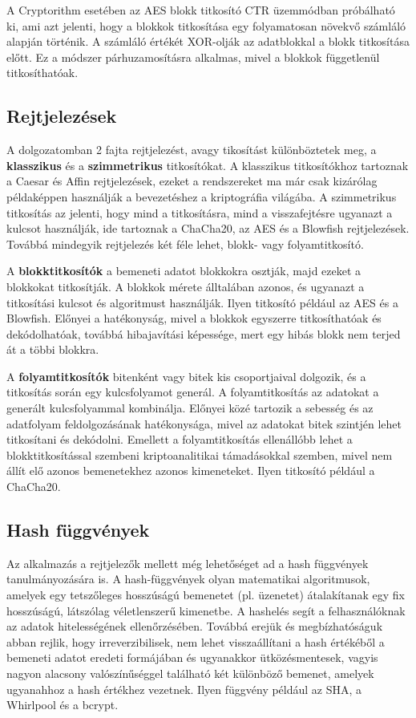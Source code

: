 A Cryptorithm esetében az AES blokk titkosító CTR üzemmódban próbálható ki, ami azt jelenti, hogy a blokkok titkosítása egy folyamatosan növekvő számláló alapján történik. A számláló értékét XOR-olják az adatblokkal a blokk titkosítása előtt. Ez a módszer párhuzamosításra alkalmas, mivel a blokkok függetlenül titkosíthatóak.

\subsection{Rejtjelezések}
A dolgozatomban 2 fajta rejtjelezést, avagy tikosítást különböztetek meg, a \textbf{klasszikus} és a \textbf{szimmetrikus} titkosítókat. A klasszikus titkosítókhoz tartoznak a Caesar és Affin rejtjelezések, ezeket a rendszereket ma már csak kizárólag példaképpen használják a bevezetéshez a kriptográfia világába. A szimmetrikus titkosítás az jelenti, hogy mind a titkosításra, mind a visszafejtésre ugyanazt a kulcsot használják, ide tartoznak a ChaCha20, az AES és a Blowfish rejtjelezések. Továbbá mindegyik rejtjelezés két féle lehet, blokk- vagy folyamtitkosító.

A \textbf{blokktitkosítók} a bemeneti adatot blokkokra osztják, majd ezeket a blokkokat titkosítják. A blokkok mérete álltalában azonos, és ugyanazt a titkosítási kulcsot és algoritmust használják. Ilyen titkosító például az AES és a Blowfish. Előnyei a hatékonyság, mivel a blokkok egyszerre titkosíthatóak és dekódolhatóak, továbbá hibajavítási képessége, mert egy hibás blokk nem terjed át a többi blokkra.

A \textbf{folyamtitkosítók} bitenként vagy bitek kis csoportjaival dolgozik, és a titkosítás során egy kulcsfolyamot generál. A folyamtitkosítás az adatokat a generált kulcsfolyammal kombinálja. Előnyei közé tartozik a sebesség és az adatfolyam feldolgozásának hatékonysága, mivel az adatokat bitek szintjén lehet titkosítani és dekódolni. Emellett a folyamtitkosítás ellenállóbb lehet a blokktitkosítással szembeni kriptoanalitikai támadásokkal szemben, mivel nem állít elő azonos bemenetekhez azonos kimeneteket. Ilyen titkosító például a ChaCha20.

\pagebreak
\subsection{Hash függvények}
Az alkalmazás a rejtjelezők mellett még lehetőséget ad a hash függvények tanulmányozására is. A hash-függvények olyan matematikai algoritmusok, amelyek egy tetszőleges hosszúságú bemenetet (pl. üzenetet) átalakítanak egy fix hosszúságú, látszólag véletlenszerű kimenetbe. A hashelés segít a felhasználóknak az adatok hitelességének ellenőrzésében. Továbbá erejük és megbízhatóságuk abban rejlik, hogy irreverzibilisek, nem lehet visszaállítani a hash értékéből a bemeneti adatot eredeti formájában és ugyanakkor ütközésmentesek, vagyis nagyon alacsony valószínűséggel található két különböző bemenet, amelyek ugyanahhoz a hash értékhez vezetnek. Ilyen függvény például az SHA, a Whirlpool és a bcrypt.


